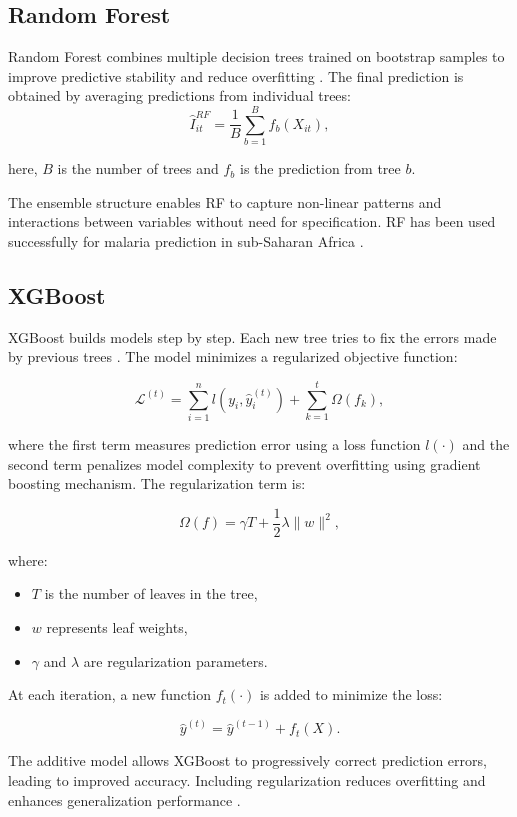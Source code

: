 	\subsection{Random Forest}
	Random Forest combines multiple decision trees trained on bootstrap samples to improve predictive stability and reduce overfitting \cite{Egbuna2025}. The final prediction is obtained by averaging predictions from individual trees:
	\[
	\hat{I}_{it}^{RF} = \frac{1}{B} \sum_{b=1}^{B} f_b(X_{it}),
	\]
	
	here, \(B\) is the number of trees and \(f_b\) is the prediction from tree \(b\).
	
	 
	 The ensemble  structure enables RF to capture non-linear patterns and interactions between variables without need for specification. RF has been used successfully for malaria prediction in sub-Saharan Africa \cite{Egbuna2025}.
	
	\subsection{XGBoost}
	\label{sec:XGBoost}
     XGBoost builds models step by step. Each new tree tries to fix the errors made by previous trees \cite{Okundalaye2025Climate-based}. The model minimizes a regularized objective function:
	
	\[
	\mathcal{L}^{(t)} = \sum_{i=1}^{n} l(y_i, \hat{y}_i^{(t)}) + \sum_{k=1}^{t} \Omega(f_k),
	\]
	
	where the first term measures prediction error using a loss function \(l(\cdot)\) and the second term penalizes model complexity to prevent overfitting \cite{Egbuna2025} using gradient boosting mechanism. The regularization term is:
	
	\[
	\Omega(f) = \gamma T + \frac{1}{2} \lambda \|w\|^2,
	\]
	
	where:
	\begin{itemize}
		\item $T$ is the number of leaves in the tree,
		\item $w$ represents leaf weights,
		\item $\gamma$ and $\lambda$ are regularization parameters.
	\end{itemize}
	At each iteration, a new function $f_t(\cdot)$ is added to minimize the loss:
	
	
	\[
	\hat{y}^{(t)} = \hat{y}^{(t-1)} + f_t(X).
	\]
	
	The additive model allows XGBoost to progressively correct prediction errors, leading to improved accuracy. Including regularization reduces overfitting and enhances generalization performance \cite{Ly2025Forecasting}.


